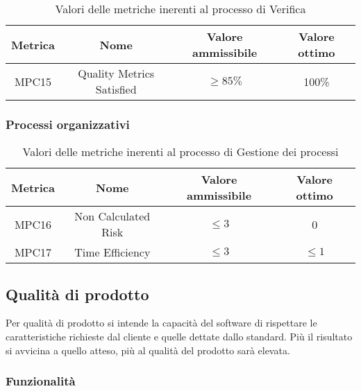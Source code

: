 \documentclass[italian,12pt]{article} %
\begin{document}

\begin{table}[h!]
	\centering
	\begin{tabular}{|c|c|c|c|} 
	 \hline
	 Metrica & Nome & Valore ammissibile & Valore ottimo \\  
	 \hline
	 MPC15 & Quality Metrics Satisfied & $\geq 85\% $ & 100\% \\
	 \hline
	\end{tabular}
	\caption{ Valori delle metriche inerenti al processo di Verifica}
	\label{table:5}
	\end{table}

\subsubsection{Processi organizzativi}


\begin{table}[h!]
	\centering
	\begin{tabular}{|c|c|c|c|} 
	 \hline
	 Metrica & Nome & Valore ammissibile & Valore ottimo \\  
	 \hline
	 MPC16 & Non Calculated Risk & $\leq 3 $ & 0 \\
	 \hline
	 MPC17 & Time Efficiency & $\leq 3 $ & $\leq 1 $ \\
	 \hline
	\end{tabular}
	\caption{ Valori delle metriche inerenti al processo di Gestione dei processi}
	\label{table:6}
	\end{table}


\subsection{Qualità di prodotto}

Per qualità di prodotto si intende la capacità del software di rispettare 
le caratteristiche richieste dal cliente e quelle dettate dallo standard.
Più il risultato si avvicina a quello atteso, più al qualità del prodotto
sarà elevata. 

\subsubsection{Funzionalità}
\end{document}

